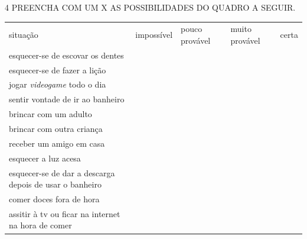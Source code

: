 %
%
%
%

\num{4} PREENCHA COM UM X AS POSSIBILIDADES DO QUADRO A SEGUIR.

\begin{longtable}[]{@{}lllll@{}}
\toprule
situação & impossível & pouco provável & muito provável &
certa\tabularnewline
esquecer-se de escovar os dentes & & & &\tabularnewline
esquecer-se de fazer a lição & & & &\tabularnewline
jogar \textit{videogame} todo o dia & & & &\tabularnewline
sentir vontade de ir ao banheiro & & & &\tabularnewline
brincar com um adulto & & & &\tabularnewline
brincar com outra criança & & & &\tabularnewline
receber um amigo em casa & & & &\tabularnewline
esquecer a luz acesa & & & &\tabularnewline
esquecer-se de dar a descarga depois de usar o banheiro & & &
&\tabularnewline
comer doces fora de hora & & & &\tabularnewline
assitir à tv ou ficar na internet na hora de comer & & & &\tabularnewline
\bottomrule
\end{longtable}

